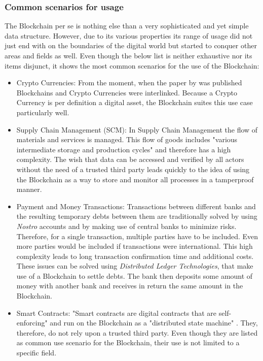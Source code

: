 \subsubsection{Common scenarios for usage}
The Blockchain per se is nothing else than a very sophisticated and yet simple data structure. However, due to its various properties its range of usage did not just end with on the boundaries of the digital world but started to conquer other areas and fields as well. Even though the below list is neither exhaustive nor its items disjunct, it shows the most common scenarios for the use of the Blockchain\cite{Wust2017}:
\begin{itemize}
  \item Crypto Currencies: From the moment, when the paper by \citeauthor{Nakamoto2008} was published Blockchains and Crypto Currencies were interlinked. Because a Crypto Currency is per definition a digital asset, the Blockchain suites this use case particularly well.
  \item Supply Chain Management (SCM): In Supply Chain Management the flow of materials and services is managed. This flow of goods includes "various intermediate storage and production cycles" \cite{Wust2017} and therefore has a high complexity. The wish that data can be accessed and verified by all actors without the need of a trusted third party leads quickly to the idea of using the Blockchain as a way to store and monitor all processes in a tamperproof manner.
  \item Payment and Money Transactions: Transactions between different banks and the resulting temporary debts between them are traditionally solved by using \textit{Nostro} accounts and by making use of central banks to minimize risks. Therefore, for a single transaction, multiple parties have to be included. Even more parties would be included if transactions were international. This high complexity leads to long transaction confirmation time and additional costs. These issues can be solved using \textit{Distributed Ledger Technologies}, that make use of a Blockchain to settle debts. The bank then deposits some amount of money with another bank and receives in return the same amount in the Blockchain.
  \item Smart Contracts: "Smart contracts are digital contracts that are self-enforcing" and run on the Blockchain as a "distributed state machine" \cite{Wust2017}. They, therefore, do not rely upon a trusted third party. Even though they are listed as common use scenario for the Blockchain, their use is not limited to a specific field.

\end{itemize}

